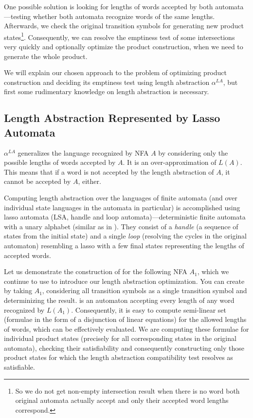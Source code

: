 One possible solution is looking for lengths of words accepted by both automata---testing whether both automata recognize words of the same lengths. Afterwards, we check the original transition symbols for generating new product states\footnote{So we do not get non-empty intersection result when there is no word both original automata actually accept and only their accepted word lengths correspond.}. Consequently, we can resolve the emptiness test of some intersections very quickly and optionally optimize the product construction, when we need to generate the whole product.

We will explain our chosen approach to the problem of optimizing product construction and deciding its emptiness test using length abstraction $\alpha^{LA}$, but first some rudimentary knowledge on length abstraction is necessary.

\subsection{Length Abstraction Represented by Lasso Automata} \label{sec:length_abstraction}

$\alpha^{LA}$ generalizes the language recognized by NFA $A$ by considering only the possible lengths of words accepted by $A$. It is an over-approximation of $L(A)$. This means that if a word is not accepted by the length abstraction of $A$, it cannot be accepted by $A$, either.

Computing length abstraction over the languages of finite automata (and over individual state languages in the automata in particular) is accomplished using lasso automata (LSA, handle and loop automata)---deterministic finite automata with a unary alphabet (similar as in \cite{DBLP:conf/cav/AbdullaACHRRS14}). They consist of a \emph{handle} (a sequence of states from the initial state) and a single \emph{loop} (resolving the cycles in the original automaton) resembling a lasso with a few final states representing the lengths of accepted words.

Let us demonstrate the construction of  for the following NFA $A_1$, which we continue to use to introduce our length abstraction optimization. You can create  by taking $A_1$, considering all transition symbols as a single transition symbol and determinizing the result.  is an automaton accepting every length of any word recognized by $L(A_1)$. Consequently, it is easy to compute semi-linear set (formulae in the form of a disjunction of linear equations) for the allowed lengths of words, which can be effectively evaluated. We are computing these formulae for individual product states (precisely for all corresponding states in the original automata), checking their satisfiability and consequently constructing only those product states for which the length abstraction compatibility test resolves as satisfiable.

